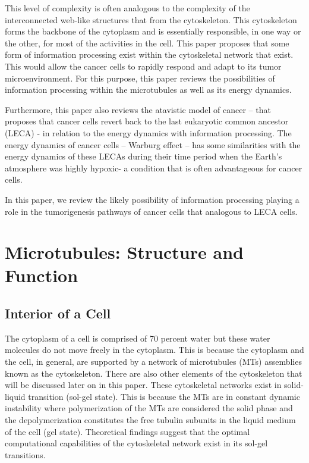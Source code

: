 \documentclass[letterpaper,final,times]{cas-dc}
\numberwithin{equation}{section}
\begin{document}
This level of complexity is often analogous to the complexity of the interconnected web-like structures that from the cytoskeleton. This cytoskeleton forms the backbone of the cytoplasm and is essentially responsible, in one way or the other, for most of the activities in the cell. This paper proposes that some form of information processing exist within the cytoskeletal network that exist. This would allow the cancer cells to rapidly respond and adapt to its tumor microenvironment. For this purpose, this paper reviews the possibilities of information processing within the microtubules as well as its energy dynamics.

Furthermore, this paper also reviews the atavistic model of cancer – that proposes that cancer cells revert back to the last eukaryotic common ancestor (LECA) - in relation to the energy dynamics with information processing. The energy dynamics of cancer cells – Warburg effect – has some similarities with the energy dynamics of these LECAs during their time period when the Earth’s atmosphere was highly hypoxic- a condition that is often advantageous for cancer cells.

In this paper, we review the likely possibility of information processing playing a role in the tumorigenesis pathways of cancer cells that analogous to LECA cells.

\section{Microtubules: Structure and Function}
\subsection{Interior of a Cell}\noindent
The cytoplasm of a cell is comprised of 70 percent water but these water molecules do not move freely in the cytoplasm. This is because the cytoplasm and the cell, in general, are supported by a network of microtubules (MTs) assemblies known as the cytoskeleton. There are also other elements of the cytoskeleton that will be discussed later on in this paper. These cytoskeletal networks exist in solid-liquid transition (sol-gel state). This is because the MTs are in constant dynamic instability where polymerization of the MTs are considered the solid phase and the depolymerization constitutes the free tubulin subunits in the liquid medium of the cell (gel state)\citep{rasmussen1990}. Theoretical findings suggest that the optimal computational capabilities of the cytoskeletal network exist in its sol-gel transitions\citep{langton1990}.
\end{document}
